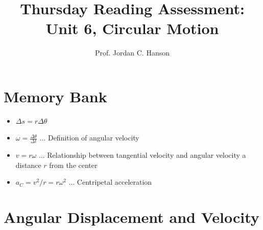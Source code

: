 \documentclass{article}
\begin{document}
\title{Thursday Reading Assessment: Unit 6, Circular Motion}
\author{Prof. Jordan C. Hanson}

\maketitle

\section{Memory Bank}

\begin{itemize}
\item $\Delta s = r \Delta \theta$
\item $\omega = \frac{\Delta \theta}{\Delta t}$ ... Definition of angular velocity
\item $v = r\omega $ ... Relationship between tangential velocity and angular velocity a distance $r$ from the center
\item $a_C = v^2/r = r \omega^2$ ... Centripetal acceleration
\end{itemize}

\section{Angular Displacement and Velocity}
\end{document}
